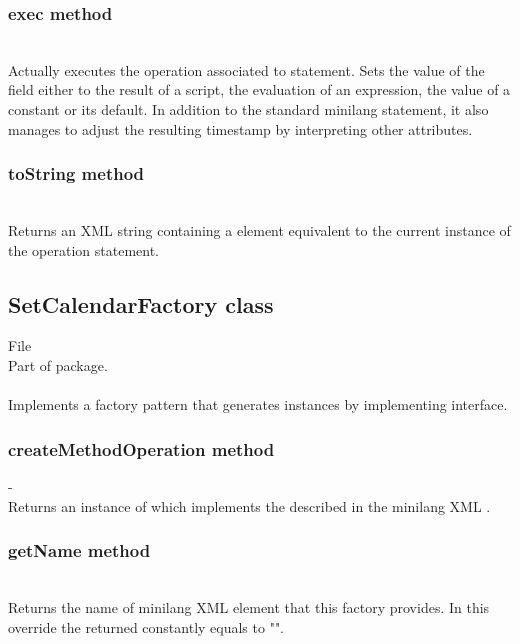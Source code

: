 \subsubsection{exec method}
\\

Actually executes the operation associated to  statement. Sets the value of the field either to the result of a script, the evaluation of an expression, the value of a constant or its default. In addition to the standard minilang  statement, it also manages to adjust the resulting timestamp by interpreting other  attributes.

\subsubsection{toString method}
\\

Returns an XML string containing a  element equivalent to the current instance of the  operation statement.



\subsection{SetCalendarFactory class}
File \\
Part of  package.\\\\
Implements a factory pattern that generates  instances by implementing  interface.

\subsubsection{createMethodOperation method}
-\\

Returns an instance of  which implements the  described in the minilang XML .

\subsubsection{getName method}
\\

Returns the name of minilang XML element that this factory provides. In this override the returned  constantly equals to "".